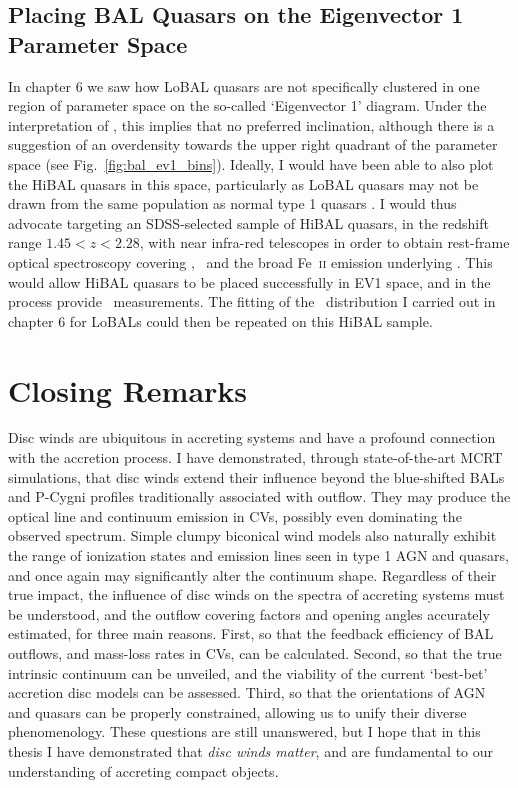 \subsection{Placing BAL Quasars on the Eigenvector 1 Parameter Space}

In chapter 6 we saw how LoBAL quasars are not specifically clustered
in one region of parameter space on the so-called `Eigenvector 1'
diagram. Under the interpretation of \cite{shenho2014}, this implies that
no preferred inclination, although there is a suggestion
of an overdensity towards the upper right quadrant of the parameter space 
(see Fig.~\ref{fig:bal_ev1_bins}). Ideally, I would have been able to
also plot the HiBAL quasars in this space, particularly as LoBAL quasars
may not be drawn from the same population as normal type 1 quasars 
\citep[e.g.][]{urrutia2009,dai2012}. I would thus advocate targeting an
SDSS-selected sample of HiBAL quasars, in the redshift range $1.45<z<2.28$,
with near infra-red telescopes in order 
to obtain rest-frame optical spectroscopy covering
\hb, \oiiifull\ and the broad Fe~\textsc{ii} emission underlying \hb. This
would allow HiBAL quasars to be placed successfully in EV1 space, and in the 
process provide \ewo\ measurements. The fitting of the \ewo\ distribution
I carried out in chapter 6 for LoBALs could then be repeated on this HiBAL sample.

\section{Closing Remarks}

Disc winds are ubiquitous in accreting systems and have a 
profound connection with the accretion process. I have demonstrated,
through state-of-the-art MCRT simulations, that disc winds extend their
influence beyond the blue-shifted BALs and P-Cygni profiles traditionally
associated with outflow. They may produce the optical line and continuum emission
in CVs, possibly even dominating the observed spectrum. Simple clumpy biconical
wind models also naturally exhibit the range of ionization states
and emission lines seen in type 1 AGN and quasars, and once again
may significantly alter the continuum shape. Regardless of their true
impact, the influence of disc winds on the spectra of accreting systems
must be understood, and the outflow covering factors and opening angles 
accurately estimated, for three main reasons. First, so that the feedback 
efficiency of BAL outflows, and mass-loss rates in CVs,
can be calculated. Second, so that the true intrinsic continuum can be unveiled, and 
the viability of the current `best-bet' accretion disc models can be assessed. 
Third, so that the orientations of AGN and quasars can be properly constrained,
allowing us to unify their diverse phenomenology. 
These questions are still unanswered, but I hope that in this thesis I have
demonstrated that {\em disc winds matter}, and are fundamental
to our understanding of accreting compact objects.